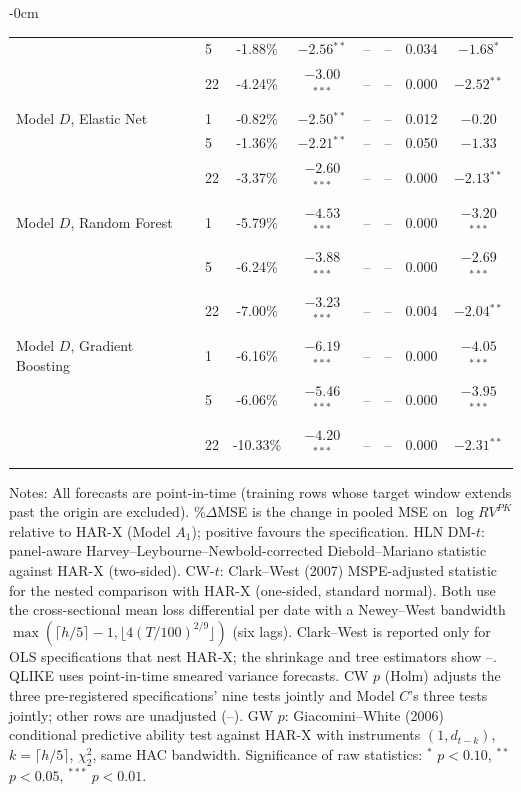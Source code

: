 \begin{table}[htbp]
\begin{adjustwidth}{-\extralength}{0cm}
\begin{tabular}{llcccccc}
 & 5 & -1.88\% & $-2.56$$^{**}$ & -- & -- & 0.034 & $-1.68$$^{*}$ \\
 & 22 & -4.24\% & $-3.00$$^{***}$ & -- & -- & 0.000 & $-2.52$$^{**}$ \\
\midrule
Model $D$, Elastic Net & 1 & -0.82\% & $-2.50$$^{**}$ & -- & -- & 0.012 & $-0.20$ \\
 & 5 & -1.36\% & $-2.21$$^{**}$ & -- & -- & 0.050 & $-1.33$ \\
 & 22 & -3.37\% & $-2.60$$^{***}$ & -- & -- & 0.000 & $-2.13$$^{**}$ \\
\midrule
Model $D$, Random Forest & 1 & -5.79\% & $-4.53$$^{***}$ & -- & -- & 0.000 & $-3.20$$^{***}$ \\
 & 5 & -6.24\% & $-3.88$$^{***}$ & -- & -- & 0.000 & $-2.69$$^{***}$ \\
 & 22 & -7.00\% & $-3.23$$^{***}$ & -- & -- & 0.004 & $-2.04$$^{**}$ \\
\midrule
Model $D$, Gradient Boosting & 1 & -6.16\% & $-6.19$$^{***}$ & -- & -- & 0.000 & $-4.05$$^{***}$ \\
 & 5 & -6.06\% & $-5.46$$^{***}$ & -- & -- & 0.000 & $-3.95$$^{***}$ \\
 & 22 & -10.33\% & $-4.20$$^{***}$ & -- & -- & 0.000 & $-2.31$$^{**}$ \\
\midrule
\bottomrule
\end{tabular}
\begin{tablenotes}\small
\item Notes: All forecasts are point-in-time (training rows whose target window extends past the origin are excluded). \%$\Delta$MSE is the change in pooled MSE on $\log RV^{PK}$ relative to HAR-X (Model $A_1$); positive favours the specification. HLN DM-$t$: panel-aware Harvey--Leybourne--Newbold-corrected Diebold--Mariano statistic against HAR-X (two-sided). CW-$t$: Clark--West (2007) MSPE-adjusted statistic for the nested comparison with HAR-X (one-sided, standard normal). Both use the cross-sectional mean loss differential per date with a Newey--West bandwidth $\max(\lceil h/5\rceil-1, \lfloor 4(T/100)^{2/9}\rfloor)$ (six lags). Clark--West is reported only for OLS specifications that nest HAR-X; the shrinkage and tree estimators show --. QLIKE uses point-in-time smeared variance forecasts. CW $p$ (Holm) adjusts the three pre-registered specifications' nine tests jointly and Model $C$'s three tests jointly; other rows are unadjusted (--). GW $p$: Giacomini--White (2006) conditional predictive ability test against HAR-X with instruments $(1, d_{t-k})$, $k=\lceil h/5\rceil$, $\chi^2_2$, same HAC bandwidth. Significance of raw statistics: $^{*}$ $p<0.10$, $^{**}$ $p<0.05$, $^{***}$ $p<0.01$.
\end{tablenotes}
\end{adjustwidth}
\end{table}
